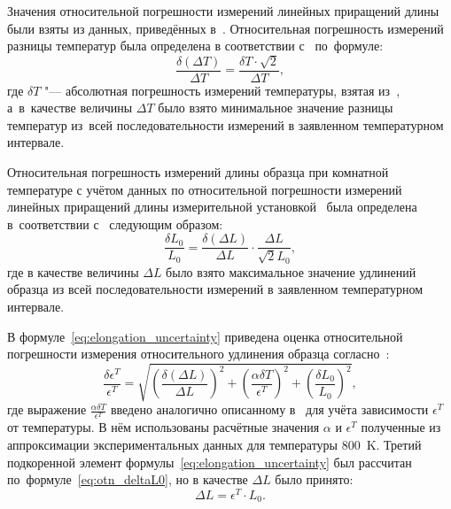 Значения относительной погрешности измерений линейных приращений длины были
взяты из данных, приведённых в~\cite{ref_gosreestr_tma_ss}. Относительная
погрешность измерений разницы температур была определена в соответствии
с~\cites[57]{KassandrovaLebedev1970Obrabotka} по~формуле:
\begin{equation}
    \frac{\delta (\Delta T)}{\Delta T}=\frac{\delta T\cdot \sqrt 2}{\Delta T},
\end{equation}
где  $\delta T$ "--- абсолютная погрешность измерений температуры, взятая из~\cite{ref_gosreestr_tma_ss}, а~в~качестве величины  $\Delta T$ было взято минимальное значение разницы температур из~всей последовательности измерений в заявленном температурном интервале.

Относительная погрешность измерений длины образца при комнатной температуре с
учётом данных по относительной погрешности измерений линейных приращений длины
измерительной установкой~\cite{ref_gosreestr_tma_ss} была определена
в~соответствии с~\cites[57]{KassandrovaLebedev1970Obrabotka} следующим образом:
\begin{equation}
    \label{eq:otn_deltaL0}
    \frac{\delta L_0}{L_0}=\frac{\delta (\Delta L)}{\Delta L}\cdot \frac{\Delta L}{\sqrt 2L_0},
\end{equation}
где в качестве величины  $\Delta L$ было взято максимальное значение удлинений образца из всей последовательности измерений в заявленном температурном интервале.

В формуле~\eqref{eq:elongation_uncertainty} приведена оценка относительной
погрешности измерения относительного удлинения образца
согласно~\cites[58]{KassandrovaLebedev1970Obrabotka}:
\begin{equation}
    \label{eq:elongation_uncertainty}
    \frac{\delta \epsilon^T}{\epsilon^T}
    =
    \sqrt{
        \left(
            \frac{\delta (\Delta L)}{\Delta L}
        \right)^{\!\!2} %
        +
        \left(
            \frac{\alpha \delta T}{\epsilon^T}
        \right)^{\!\!2} %
        +
        \left(
            \frac{\delta L_0}{L_0}
        \right)^{\!\!2} %
    },
\end{equation}
где выражение  $\displaystyle\frac{\alpha \delta T}{\epsilon^T}$ введено аналогично описанному в~\cite{LTEC_si_293_1000} для учёта зависимости  $\epsilon^T$ от температуры. В нём использованы расчётные значения  $\alpha$ и  $\epsilon^T$ полученные из аппроксимации экспериментальных данных для температуры 800~K. Третий подкоренной элемент формулы~\eqref{eq:elongation_uncertainty} был рассчитан
по~формуле~\eqref{eq:otn_deltaL0}, но в качестве  $\Delta L$ было принято:
\begin{equation}
    \Delta L=\epsilon^T\cdot L_0.
\end{equation}

